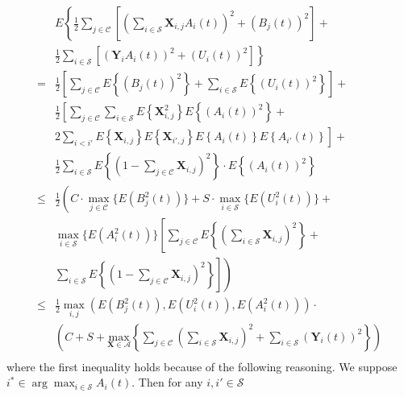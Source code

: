 \documentclass[10pt,journal,compsoc]{IEEEtran}
\begin{document}
\begin{equation}\label{final-ineq}
	\begin{array}{cl}
		& \displaystyle E\left\{ \frac{1}{2} \sum_{j \in \mathcal{C}} \left[ \left( \sum_{i \in \mathcal{S}} \mathbf{X}_{i,j} A_i(t) \right)^2  + \left( B_j(t) \right)^2 \right] + \right. \\
		& \displaystyle \left. \frac{1}{2} \sum_{i \in \mathcal{S}} \left[ \left( \mathbf{Y}_{i} A_i(t) \right)^2  + \left( U_i(t) \right)^2 \right] \right\} \\
		= & \displaystyle \frac{1}{2} \left[ \sum_{j \in \mathcal{C}} E\left\{ \left( B_j(t) \right)^2 \right\} + \sum_{i \in \mathcal{S}} E\left\{ \left( U_i(t) \right)^2 \right\} \right] + \\
		& \displaystyle \frac{1}{2} \left[ \sum_{j \in \mathcal{C}} \sum_{i \in \mathcal{S}} E \left\{ \mathbf{X}_{i,j}^2 \right\} E\left\{ \left(A_i(t)\right)^2 \right\} \right. + \\
		& \displaystyle \left. 2\sum_{i < i'} E\left\{ \mathbf{X}_{i,j} \right\} E\left\{ \mathbf{X}_{i',j} \right\} E\left\{ A_{i}(t) \right\} E\left\{ A_{i'}(t) \right\} \right] + \\
		& \displaystyle \frac{1}{2} \sum_{i \in \mathcal{S}} E \left\{ (1 - \sum_{j \in \mathcal{C}} \mathbf{X}_{i,j})^2 \right\} \cdot E\left\{ \left(A_i(t)\right)^2 \right\} \\
		\le & \displaystyle \frac{1}{2} \left( C \cdot \max_{j \in \mathcal{C}} \{ E(B_j^2(t))\} + S \cdot \max_{i \in \mathcal{S}} \{ E(U_i^2(t))\} + \right. \\
		& \displaystyle \max_{i \in \mathcal{S}} \{ E(A_i^2(t))\} \left[ 
			\sum_{j \in \mathcal{C}} E \left\{ \left( \sum_{i \in \mathcal{S}} \mathbf{X}_{i,j} \right)^2 \right\} + \right. \\
		& \displaystyle \left. \left. \sum_{i \in \mathcal{S}} E\left\{ \left(1 - \sum_{j \in \mathcal{C}} \mathbf{X}_{i,j}\right)^2 \right\} 
		\right] \right) \\
		\le & \displaystyle \frac{1}{2} \max_{i,j} (E(B_j^2(t)), E(U_i^2(t)), E(A_i^2(t))) \cdot \\ 
		& \displaystyle \left( C + S + \underset{\mathbf{X} \in \mathcal{A}}{\text{max}} \left\{ 
				\sum_{j \in \mathcal{C}} \left( \sum_{i \in \mathcal{S}} \mathbf{X}_{i,j} \right)^2 
				+ \sum_{i \in \mathcal{S}} (\mathbf{Y}_i(t))^2
			\right\} \right) \\
	\end{array}
\end{equation}
where the first inequality holds because of the following reasoning. We suppose $i^{*} \in \arg \max_{i \in \mathcal{S}} A_i(t)$. Then for any $i, i' \in \mathcal{S}$
\end{document}
